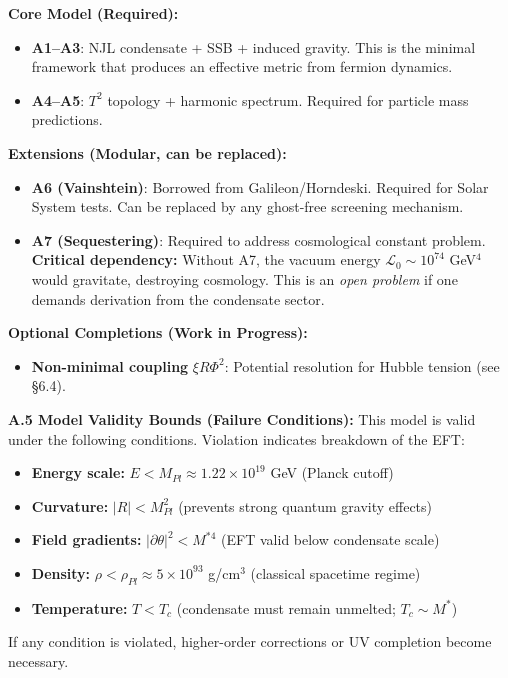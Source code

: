 \documentclass[a4paper,12pt]{article}
\begin{document}
\textbf{Core Model (Required):}
\begin{itemize}
\item \textbf{A1--A3}: NJL condensate + SSB + induced gravity. This is the minimal framework that produces an effective metric from fermion dynamics.
\item \textbf{A4--A5}: $T^2$ topology + harmonic spectrum. Required for particle mass predictions.
\end{itemize}

\textbf{Extensions (Modular, can be replaced):}
\begin{itemize}
\item \textbf{A6 (Vainshtein)}: Borrowed from Galileon/Horndeski. Required for Solar System tests. Can be replaced by any ghost-free screening mechanism.
\item \textbf{A7 (Sequestering)}: Required to address cosmological constant problem. \textbf{Critical dependency:} Without A7, the vacuum energy $\mathcal{L}_0 \sim 10^{74}$ GeV$^4$ would gravitate, destroying cosmology. This is an \emph{open problem} if one demands derivation from the condensate sector.
\end{itemize}

\textbf{Optional Completions (Work in Progress):}
\begin{itemize}
\item \textbf{Non-minimal coupling} $\xi R\Phi^2$: Potential resolution for Hubble tension (see §6.4).
\end{itemize}

\textbf{A.5 Model Validity Bounds (Failure Conditions):}
This model is valid under the following conditions. Violation indicates breakdown of the EFT:
\begin{itemize}
    \item \textbf{Energy scale:} $E < M_{Pl} \approx 1.22 \times 10^{19}$ GeV (Planck cutoff)
    \item \textbf{Curvature:} $|R| < M_{Pl}^2$ (prevents strong quantum gravity effects)
    \item \textbf{Field gradients:} $|\partial\theta|^2 < M^{*4}$ (EFT valid below condensate scale)
    \item \textbf{Density:} $\rho < \rho_{Pl} \approx 5 \times 10^{93}$ g/cm$^3$ (classical spacetime regime)
    \item \textbf{Temperature:} $T < T_c$ (condensate must remain unmelted; $T_c \sim M^*$)
\end{itemize}
If any condition is violated, higher-order corrections or UV completion become necessary.
\end{document}
